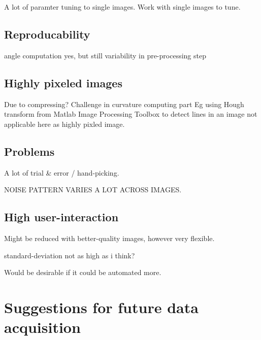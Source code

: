 A lot of paramter tuning to single images. Work with single images to tune.


\subsection{Reproducability}

angle computation yes, but still variability in pre-processing step


\subsection{Highly pixeled images}
Due to compressing? 
Challenge in curvature computing part
Eg using Hough transform from Matlab Image Processing Toolbox to detect lines in an image not applicable here as highly pixled image.


\subsection{Problems}
A lot of trial \& error / hand-picking. 


NOISE PATTERN VARIES A LOT ACROSS IMAGES.

\subsection{High user-interaction}
Might be reduced with better-quality images, however very flexible.


standard-deviation not as high as i think?

Would be desirable if it could be automated more. 

\section{Suggestions for future data acquisition}


